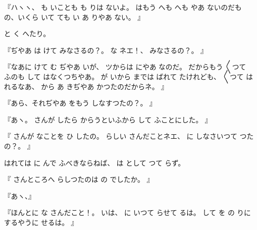 『ハヽヽ、
も
いことも
も
りは
ないよ。
はもう
へも
へも
やあ
ないのだもの、いくら
いて
ても
い
あ
りやあ
ない。
』

と
く
へたり。

『ぢやあ
は
けて
みなさるの？。
な
ネエ！、
みなさるの？。
』

『なあに
けて
む
ぢやあ
いが、
ツからは
にやあ
なのだ。
だからもう
〳〵つて
ふのも
して
はなくつちやあ。
が
いから
までは
ばれて
たけれども、
〳〵つて
はれるなあ、
から
あ
きぢやあ
かつたのだからネ。
』

『あら、それぢやあ
をもう
しなすつたの？。
』

『あヽ。
さんが
したら
からうといふから
して
ふことにした。
』

『
さんが
なことを
ひ
したの。
らしい
さんだことネエ、
に
しなさいつて
つたの？。
』

はれては
に
んで
ふべきならねば、
は
として
つて
らず。

『
さんところへ
らしつたのは
の
でしたか。
』

『あヽ、』

『ほんとに
な
さんだこと！。
いは、
に
いつて
らせて
るは。
して
を
の
りにするやうに
せるは。
』

